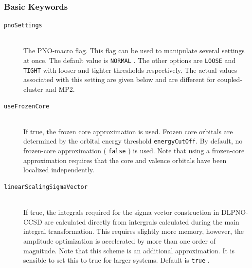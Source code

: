 \documentclass[bibliography=totocnumbered,a4paper,10pt,oneside]{scrbook}
\newcommand{\ttt}[1]{%
  \begingroup\setlength{\fboxsep}{1pt}%
  \colorbox{serenity-green!30}{\texttt{\hspace*{2pt}\vphantom{(g}#1\hspace*{2pt}}}%
  \endgroup
}
\begin{document}
\subsubsection{Basic Keywords}
\begin{description}
  \item [\texttt{pnoSettings}]\hfill \\
  The PNO-macro flag. This flag can be used to manipulate several settings at once. The default value is
  \ttt{NORMAL}. The other options are \ttt{LOOSE} and \ttt{TIGHT} with looser and tighter thresholds
  respectively. The actual values associated with this setting are given below and are different for
  coupled-cluster and MP2.
 \item [\texttt{useFrozenCore}]\hfill \\
 If true, the frozen core approximation is used. Frozen core orbitals are determined by the orbital energy
 threshold \texttt{energyCutOff}. By default, no frozen-core approximation (\ttt{false}) is used. Note
 that using a frozen-core approximation requires that the core and valence orbitals have been localized
 independently.
 \item [\texttt{linearScalingSigmaVector}]\hfill \\
 If true, the integrals required for the sigma vector construction in DLPNO-CCSD are calculated directly from
 intergrals calculated during the main integral transformation. This requires slightly more memory, however,
 the amplitude optimization is accelerated by more than one order of magnitude. Note that this scheme is an
 additional approximation. It is sensible to set this to true for larger systems. Default is \ttt{true}.
\end{description}
\end{document}
